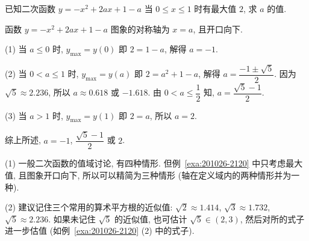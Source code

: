 \begin{example}\label{exa:201026-2120}
  已知二次函数 $y=-x^2+2ax+1-a$ 当 $0\leqslant x\leqslant 1$ 时有最大值 $2$, 求 $a$ 的值.
\end{example}
\begin{solution}
  函数 $y=-x^2+2ax+1-a$ 图象的对称轴为 $x=a$, 且开口向下.
  
  (1) 当 $a\leqslant 0$ 时, $y_{\max}= y(0)$ 即 $2=1-a$, 解得 $a=-1$.
  
  (2) 当 $0<a\leqslant 1$ 时, $y_{\max}= y(a)$ 即 $2=a^2+1-a$, 解得 $a=\dfrac{-1\pm\sqrt5}2$. 因为 $\sqrt5\approx 2.236$, 所以 $a\approx 0.618$ 或 $-1.618$. 由 $0<a\leqslant \dfrac12$ 知, $a=\dfrac{\sqrt5-1}2$.
  
  (3) 当 $a>1$ 时, $y_{\max}= y(1)$ 即 $2=a$, 所以 $a=2$.
  
  综上所述, $a=-1$, $\dfrac{\sqrt5-1}2$ 或 $2$.
\end{solution}
\begin{remark}
  (1) 一般二次函数的值域讨论, 有四种情形. 但例~\ref{exa:201026-2120} 中只考虑最大值, 且图象开口向下, 所以可以精简为三种情形 (轴在定义域内的两种情形并为一种).
  
  (2) 建议记住三个常用的算术平方根的近似值: $\sqrt2\approx 1.414$, $\sqrt3\approx 1.732$, $\sqrt5\approx 2.236$. 如果未记住 $\sqrt5$ 的近似值, 也可估计 $\sqrt5\in(2,3)$, 然后对所的式子进一步估值 (如例~\ref{exa:201026-2120} (2) 中的式子).
\end{remark}

